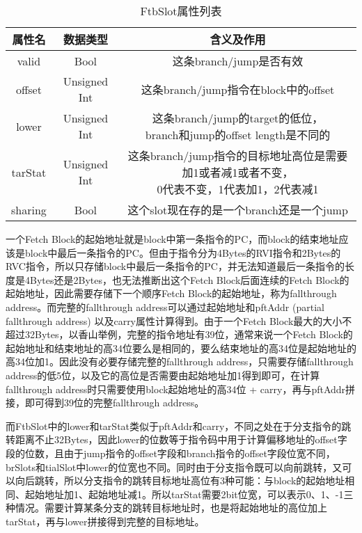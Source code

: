 \begin{table}[]
	\caption{FtbSlot属性列表}
	\label{tb:table2}
	\centering
    \begin{tabular}{ccc}
        \toprule
        属性名 & 数据类型 & 含义及作用 \\
        \midrule
        valid & Bool & 这条branch/jump是否有效 \\
		offset & Unsigned Int & 这条branch/jump指令在block中的offset \\
		lower & Unsigned Int & \tabincell{c}{这条branch/jump的target的低位， \\ branch和jump的offset length是不同的} \\
		tarStat & Unsigned Int & \tabincell{c}{这条branch/jump指令的目标地址高位是需要加1或者减1或者不变， \\ 0代表不变，1代表加1，2代表减1} \\
		sharing & Bool & 这个slot现在存的是一个branch还是一个jump \\
        \bottomrule
    \end{tabular}
\end{table}

一个Fetch Block的起始地址就是block中第一条指令的PC，而block的结束地址应该是block中最后一条指令的PC。但由于指令分为4Bytes的RVI指令和2Bytes的RVC指令，所以只存储block中最后一条指令的PC，并无法知道最后一条指令的长度是4Bytes还是2Bytes，也无法推断出这个Fetch Block后面连续的Fetch Block的起始地址，因此需要存储下一个顺序Fetch Block的起始地址，称为fallthrough address。而完整的fallthrough address可以通过起始地址和pftAddr (partial fallthrough address) 以及carry属性计算得到。由于一个Fetch Block最大的大小不超过32Bytes，以香山举例，完整的指令地址有39位，通常来说一个Fetch Block的起始地址和结束地址的高34位要么是相同的，要么结束地址的高34位是起始地址的高34位加1。因此没有必要存储完整的fallthrough address，只需要存储fallthrough address的低5位，以及它的高位是否需要由起始地址加1得到即可，在计算fallthrough address时只需要使用block起始地址的高34位 + carry，再与pftAddr拼接，即可得到39位的完整fallthrough address。

而FtbSlot中的lower和tarStat类似于pftAddr和carry，不同之处在于分支指令的跳转距离不止32Bytes，因此lower的位数等于指令码中用于计算偏移地址的offset字段的位数，且由于jump指令的offset字段和branch指令的offset字段位宽不同，brSlots和tialSlot中lower的位宽也不同。同时由于分支指令既可以向前跳转，又可以向后跳转，所以分支指令的跳转目标地址高位有3种可能：与block的起始地址相同、起始地址加1、起始地址减1。所以tarStat需要2bit位宽，可以表示0、1、-1三种情况。需要计算某条分支的跳转目标地址时，也是将起始地址的高位加上tarStat，再与lower拼接得到完整的目标地址。

